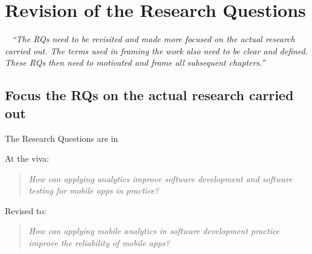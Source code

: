 \section{Revision of the Research Questions}~\label{corrections-rqs}
\emph{``The RQs need to be revisited and made more focused on the actual research carried out. The terms used in framing the work also need to be clear and defined. These RQs then need to motivated and frame all subsequent chapters.''}

\subsection{Focus the RQs on the actual research carried out}
The Research Questions are in 

\begin{kaobox}[frametitle=Revisions to the Research Questions]
At the viva:
\begin{quote}
  \emph{How can applying analytics improve software development and software testing for mobile apps in practice?}
\end{quote} 
Revised to:
\begin{quote}
  \emph{How can applying mobile analytics in software development practice improve the reliability of mobile apps?}
\end{quote}
\end{kaobox}






